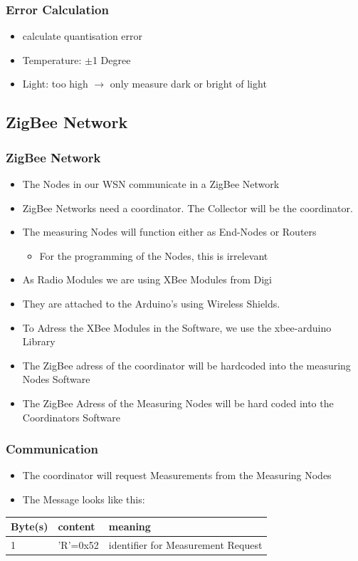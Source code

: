 \documentclass{beamer}
\begin{document}
\frame
{
	\frametitle{Error Calculation}
	\begin{itemize}
	\item calculate quantisation error
	\item Temperature: $\pm$1 Degree
	\item Light: too high $\rightarrow$ only measure dark or bright of light
	\end{itemize}
}

\subsection{ZigBee Network}
\frame
{
	\frametitle{ZigBee Network}
	
	\begin{itemize}
	
	\item The Nodes in our WSN communicate in a ZigBee Network
	\item ZigBee Networks need a coordinator. The Collector will be the coordinator.
	\item The measuring Nodes will function either as End-Nodes or Routers
	\begin{itemize}
		\item{For the programming of the Nodes, this is irrelevant}
	\end{itemize}
	
	\end{itemize}
}

\frame
{
	\begin{itemize}
	
	\item As Radio Modules we are using XBee Modules from Digi
	\item They are attached to the Arduino's using Wireless Shields.
	\item To Adress the XBee Modules in the Software, we use the xbee-arduino Library
	\item The ZigBee adress of the coordinator will be hardcoded into the measuring Nodes Software
	\item The ZigBee Adress of the Measuring Nodes will be hard coded into the Coordinators Software
	\end{itemize}
}

\frame
{
	\frametitle{Communication}

	\begin{itemize}
	\item The coordinator will request Measurements from the Measuring Nodes
	\item The Message looks like this:
	\end{itemize}
	
	\begin{table}
    \begin{tabular}{|l|l|l|}
    \hline
    Byte(s) & content  & meaning                            \\ \hline
    1       & 'R'=0x52 & identifier for Measurement Request \\ \hline
    \end{tabular}
	\end{table}
}
\end{document}
